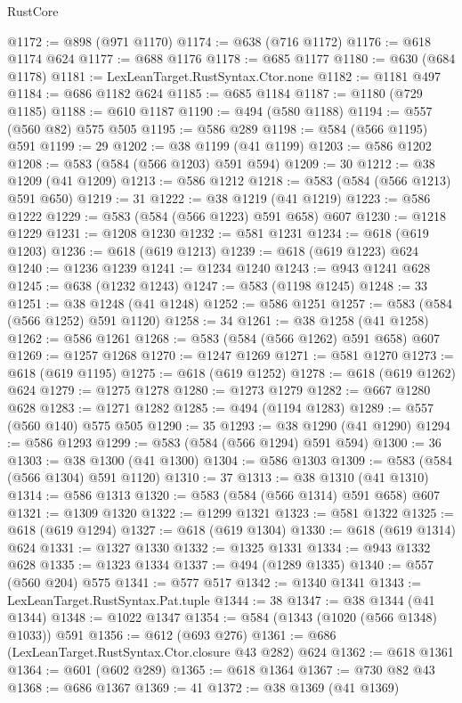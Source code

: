 \begin{lexlean}{RustCore}
\begin{coremodule}
@1172 := @898 (@971 @1170)
@1174 := @638 (@716 @1172)
@1176 := @618 @1174 @624
@1177 := @688 @1176
@1178 := @685 @1177
@1180 := @630 (@684 @1178)
@1181 := LexLeanTarget.RustSyntax.Ctor.none
@1182 := @1181 @497
@1184 := @686 @1182 @624
@1185 := @685 @1184
@1187 := @1180 (@729 @1185)
@1188 := @610 @1187
@1190 := @494 (@580 @1188)
@1194 := @557 (@560 @82) @575 @505
@1195 := @586 @289
@1198 := @584 (@566 @1195) @591
@1199 := 29
@1202 := @38 @1199 (@41 @1199)
@1203 := @586 @1202
@1208 := @583 (@584 (@566 @1203) @591 @594)
@1209 := 30
@1212 := @38 @1209 (@41 @1209)
@1213 := @586 @1212
@1218 := @583 (@584 (@566 @1213) @591 @650)
@1219 := 31
@1222 := @38 @1219 (@41 @1219)
@1223 := @586 @1222
@1229 := @583 (@584 (@566 @1223) @591 @658) @607
@1230 := @1218 @1229
@1231 := @1208 @1230
@1232 := @581 @1231
@1234 := @618 (@619 @1203)
@1236 := @618 (@619 @1213)
@1239 := @618 (@619 @1223) @624
@1240 := @1236 @1239
@1241 := @1234 @1240
@1243 := @943 @1241 @628
@1245 := @638 (@1232 @1243)
@1247 := @583 (@1198 @1245)
@1248 := 33
@1251 := @38 @1248 (@41 @1248)
@1252 := @586 @1251
@1257 := @583 (@584 (@566 @1252) @591 @1120)
@1258 := 34
@1261 := @38 @1258 (@41 @1258)
@1262 := @586 @1261
@1268 := @583 (@584 (@566 @1262) @591 @658) @607
@1269 := @1257 @1268
@1270 := @1247 @1269
@1271 := @581 @1270
@1273 := @618 (@619 @1195)
@1275 := @618 (@619 @1252)
@1278 := @618 (@619 @1262) @624
@1279 := @1275 @1278
@1280 := @1273 @1279
@1282 := @667 @1280 @628
@1283 := @1271 @1282
@1285 := @494 (@1194 @1283)
@1289 := @557 (@560 @140) @575 @505
@1290 := 35
@1293 := @38 @1290 (@41 @1290)
@1294 := @586 @1293
@1299 := @583 (@584 (@566 @1294) @591 @594)
@1300 := 36
@1303 := @38 @1300 (@41 @1300)
@1304 := @586 @1303
@1309 := @583 (@584 (@566 @1304) @591 @1120)
@1310 := 37
@1313 := @38 @1310 (@41 @1310)
@1314 := @586 @1313
@1320 := @583 (@584 (@566 @1314) @591 @658) @607
@1321 := @1309 @1320
@1322 := @1299 @1321
@1323 := @581 @1322
@1325 := @618 (@619 @1294)
@1327 := @618 (@619 @1304)
@1330 := @618 (@619 @1314) @624
@1331 := @1327 @1330
@1332 := @1325 @1331
@1334 := @943 @1332 @628
@1335 := @1323 @1334
@1337 := @494 (@1289 @1335)
@1340 := @557 (@560 @204) @575
@1341 := @577 @517
@1342 := @1340 @1341
@1343 := LexLeanTarget.RustSyntax.Pat.tuple
@1344 := 38
@1347 := @38 @1344 (@41 @1344)
@1348 := @1022 @1347
@1354 := @584 (@1343 (@1020 (@566 @1348) @1033)) @591
@1356 := @612 (@693 @276)
@1361 := @686 (LexLeanTarget.RustSyntax.Ctor.closure @43 @282) @624
@1362 := @618 @1361
@1364 := @601 (@602 @289)
@1365 := @618 @1364
@1367 := @730 @82 @43
@1368 := @686 @1367
@1369 := 41
@1372 := @38 @1369 (@41 @1369)

\end{coremodule}
\end{lexlean}
